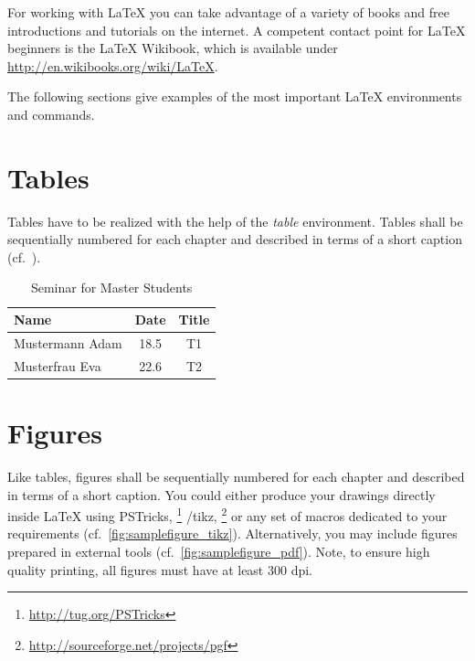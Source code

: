 \label{ch:typo}

For working with \LaTeX{} you can take advantage of a variety of books and free
introductions and tutorials on the internet.
A competent contact point for \LaTeX{} beginners is the \LaTeX{} Wikibook, which is
available under \url{http://en.wikibooks.org/wiki/LaTeX}. 

The following sections give examples of the most important \LaTeX{} environments
and commands.

\section{Tables}

Tables have to be realized with the help of the \textit{table} environment.
Tables shall be sequentially numbered for each chapter and described in terms
of a short caption (cf.\ ).

\begin{table}[htb]
	\centering
	\begin{tabular}{|l|c|c|}
		\hline \textbf{Name} & \textbf{Date} & \textbf{Title} \\
		\hline
		\hline Mustermann Adam  & 18.5   & T1    \\
		\hline Musterfrau Eva  & 22.6   & T2    \\
		\hline
	\end{tabular}
	\caption{Seminar for Master Students}
	\label{tab:diplomaseminar}
\end{table}


\section{Figures}

Like tables, figures shall be sequentially numbered for each chapter and
described in terms of a short caption.
You could either produce your drawings directly inside \LaTeX{} using
PSTricks, \footnote{\url{http://tug.org/PSTricks}} \pgf/tikz{},
\footnote{\url{http://sourceforge.net/projects/pgf}} or any set of macros
dedicated to your requirements (cf.\ \cref{fig:samplefigure_tikz}).
Alternatively, you may include figures prepared in external tools (cf.\
\cref{fig:samplefigure_pdf}).
Note, to ensure high quality printing, all figures must have at least 300 dpi.



